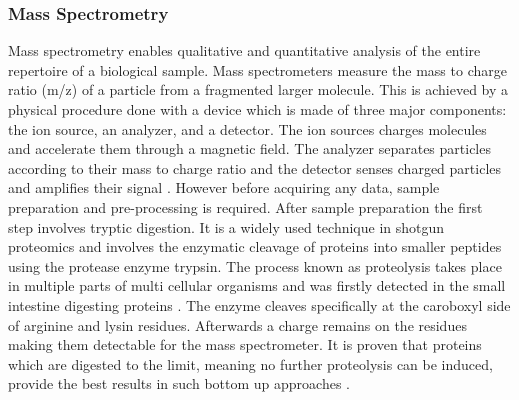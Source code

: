 \documentclass[
  11pt,
]{article}
\begin{document}
\hypertarget{mass-spectrometry}{%
\subsubsection{Mass Spectrometry}\label{mass-spectrometry}}

Mass spectrometry enables qualitative and quantitative analysis of the entire repertoire of a biological sample. Mass spectrometers measure the mass to charge ratio (m/z) of a particle from a fragmented larger molecule. This is achieved by a physical procedure done with a device which is made of three major components: the ion source, an analyzer, and a detector. The ion sources charges molecules and accelerate them through a magnetic field. The analyzer separates particles according to their mass to charge ratio and the detector senses charged particles and amplifies their signal \citep{Parker2010}. However before acquiring any data, sample preparation and pre-processing is required.
After sample preparation the first step involves tryptic digestion. It is a widely used technique in shotgun proteomics and involves the enzymatic cleavage of proteins into smaller peptides using the protease enzyme trypsin. The process known as proteolysis takes place in multiple parts of multi cellular organisms and was firstly detected in the small intestine digesting proteins \citep{Wang2008}. The enzyme cleaves specifically at the caroboxyl side of arginine and lysin residues. Afterwards a charge remains on the residues making them detectable for the mass spectrometer. It is proven that proteins which are digested to the limit, meaning no further proteolysis can be induced, provide the best results in such bottom up approaches \citep{Brownridge2011, Laskay2013}.
\end{document}
